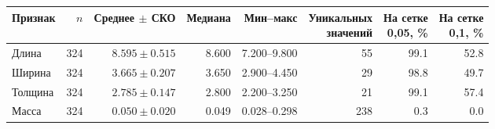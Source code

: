 \begin{tabular}{@{}lrrrrrrr@{}}
\toprule
Признак & $n$ & \shortstack{Среднее\\$\pm$ СКО} & Медиана & Мин--макс &
\shortstack{Уникальных\\значений} & \shortstack{На сетке\\0,05, \%} &
\shortstack{На сетке\\0,1, \%} \\
\midrule
Длина & 324 & $\num{8.595} \pm \num{0.515}$ & \num{8.600} & \num{7.200}--\num{9.800} & 55 & \num{99.1} & \num{52.8} \\
Ширина & 324 & $\num{3.665} \pm \num{0.207}$ & \num{3.650} & \num{2.900}--\num{4.450} & 29 & \num{98.8} & \num{49.7} \\
Толщина & 324 & $\num{2.785} \pm \num{0.147}$ & \num{2.800} & \num{2.200}--\num{3.250} & 21 & \num{99.1} & \num{57.4} \\
Масса & 324 & $\num{0.050} \pm \num{0.020}$ & \num{0.049} & \num{0.028}--\num{0.298} & 238 & \num{0.3} & \num{0.0} \\
\bottomrule
\end{tabular}
